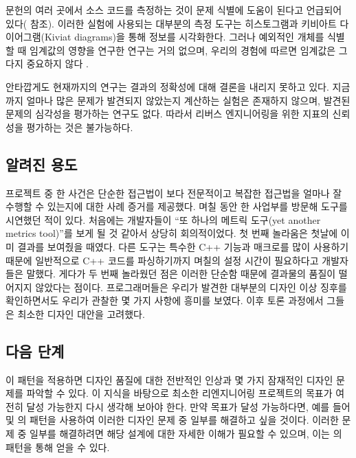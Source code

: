 \documentclass[a4paper,10pt,twoside]{book}
\begin{document}
문헌의 여러 곳에서 소스 코드를 측정하는 것이 문제 식별에 도움이 된다고 언급되어 있다(\cite{Lore94a} \cite{Fent96a} \cite{Mayr96a} \cite{Nesi98a} 참조). 이러한 실험에 사용되는 대부분의 측정 도구는 히스토그램과 키비아트 다이어그램(Kiviat diagrams)을 통해 정보를 시각화한다. 그러나 예외적인 개체를 식별할 때 임계값의 영향을 연구한 연구는 거의 없으며, 우리의 경험에 따르면 임계값은 그다지 중요하지 않다 \cite{Deme99a}.

안타깝게도 현재까지의 연구는 결과의 정확성에 대해 결론을 내리지 못하고 있다. 지금까지 얼마나 많은 문제가 발견되지 않았는지 계산하는 실험은 존재하지 않으며, 발견된 문제의 심각성을 평가하는 연구도 없다. 따라서 리버스 엔지니어링을 위한 지표의 신뢰성을 평가하는 것은 불가능하다.

\subsection*{알려진 용도}

 프로젝트 중 한 사건은 단순한 접근법이 보다 전문적이고 복잡한 접근법을 얼마나 잘 수행할 수 있는지에 대한 사례 증거를 제공했다. 며칠 동안 한 사업부를 방문해  도구를 시연했던 적이 있다. 처음에는 개발자들이 ``또 하나의 메트릭 도구(yet another metrics tool)''를 보게 될 것 같아서 상당히 회의적이었다. 첫 번째 놀라움은 첫날에 이미 결과를 보여줬을 때였다. 다른 도구는 특수한 C++ 기능과 매크로를 많이 사용하기 때문에 일반적으로 C++ 코드를 파싱하기까지 며칠의 설정 시간이 필요하다고 개발자들은 말했다. 게다가 두 번째 놀라웠던 점은 이러한 단순함 때문에 결과물의 품질이 떨어지지 않았다는 점이다. 프로그래머들은 우리가 발견한 대부분의 디자인 이상 징후를 확인하면서도 우리가 관찰한 몇 가지 사항에 흥미를 보였다. 이후 토론 과정에서 그들은 최소한 디자인 대안을 고려했다.

\subsection*{다음 단계}

이 패턴을 적용하면 디자인 품질에 대한 전반적인 인상과 몇 가지 잠재적인 디자인 문제를 파악할 수 있다. 이 지식을 바탕으로 최소한 리엔지니어링 프로젝트의 목표가 여전히 달성 가능한지 다시 생각해 보아야 한다. 만약 목표가 달성 가능하다면, 예를 들어  및 의 패턴을 사용하여 이러한 디자인 문제 중 일부를 해결하고 싶을 것이다. 이러한 문제 중 일부를 해결하려면 해당 설계에 대한 자세한 이해가 필요할 수 있으며, 이는 의 패턴을 통해 얻을 수 있다.

\ifx\wholebook\relax\else
   
   
   
\end{document}
